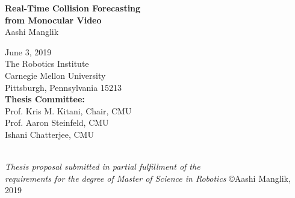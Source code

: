 \thispagestyle{empty}
\date{}

\begin{center}

{\Huge \bf Real-Time Collision Forecasting \\ \vspace{0.5cm} from Monocular Video} \\
\vspace{1cm}  
{\Large Aashi Manglik} \\
\vspace{1cm} 


{\Large June 3, 2019} \\
\vspace{2cm}
{\Large
The Robotics Institute\\
Carnegie Mellon University\\
Pittsburgh, Pennsylvania 15213\\
}
\vspace{1cm}
{\Large
{\bf Thesis Committee:}\\
Prof. Kris M. Kitani, Chair, CMU \\
Prof. Aaron Steinfeld, CMU \\
Ishani Chatterjee, CMU \\
}
\vspace{2cm}
\par ~ \\
{\large \it Thesis proposal submitted in partial fulfillment of the \\
    requirements for the degree of Master of Science in Robotics}
\vfill
{\large \copyright Aashi Manglik, 2019}
\end{center}


